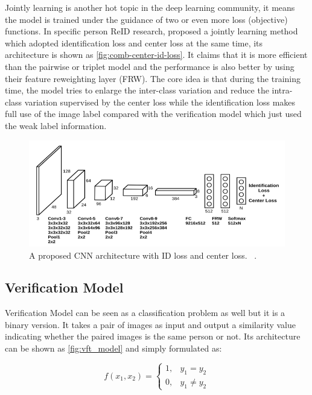 Jointly learning is another hot topic in the deep learning community, it means the model is trained under
the guidance of two or even more loss (objective) functions. In specific person 
ReID research, \cite{comb-id-and-center-loss-2017} proposed a jointly learning 
method which adopted identification loss and center loss 
\cite{center-loss-2016} at the same time, its architecture is shown as
\autoref{fig:comb-center-id-loss}. It claims that it is more efficient than the
pairwise or triplet model and the performance is also better by using their 
feature reweighting layer (FRW). The core idea is that during the training 
time, the model tries to enlarge the inter-class variation
and reduce the intra-class variation supervised by the center loss while
the identification loss makes full use of the image label compared with the 
verification model which just used the weak label information.

\begin{figure}
    \includegraphics[width=\linewidth]{figures/comb-center-id-loss.png}
    \caption{A proposed CNN architecture with ID loss and center loss.
        ~\protect\cite{comb-id-and-center-loss-2017}.}
    \label{fig:comb-center-id-loss}
\end{figure}

\subsection{Verification Model}

Verification Model can be seen as a classification problem as well but it is a 
binary version. It takes a pair of images as input and output a similarity 
value indicating whether the paired images is the same person or not. Its 
architecture can be shown as \autoref{fig:vft_model} and simply formulated as:

$$
f(x_1, x_2) =
\begin{cases}
1,&  y_1 = y_2 \\
0,&  y_1 \neq y_2
\end{cases}
$$

